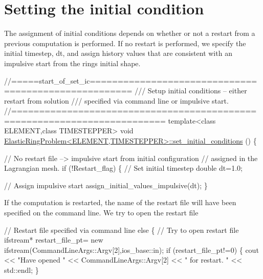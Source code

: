  

\hypertarget{index_IC}{}\section{Setting the initial condition}\label{index_IC}
The assignment of initial conditions depends on whether or not a restart from a previous computation is performed. If no restart is performed, we specify the initial timestep, {\ttfamily dt}, and assign history values that are consistent with an impulsive start from the ring\textquotesingle{}s initial shape.


\begin{DoxyCodeInclude}
\textcolor{comment}{//=====start\_of\_set\_ic=====================================================}
\textcolor{comment}{/// Setup initial conditions -- either restart from solution }
\textcolor{comment}{}\textcolor{comment}{/// specified via command line or impulsive start. }
\textcolor{comment}{}\textcolor{comment}{//=========================================================================}
\textcolor{keyword}{template}<\textcolor{keyword}{class} ELEMENT,\textcolor{keyword}{class} TIMESTEPPER>
\textcolor{keywordtype}{void} \hyperlink{classElasticRingProblem_ab435f36b59e5f76301123c3440363704}{ElasticRingProblem<ELEMENT,TIMESTEPPER>::set\_initial\_conditions}
      ()
\{

 \textcolor{comment}{// No restart file --> impulsive start from initial configuration}
 \textcolor{comment}{// assigned in the Lagrangian mesh.}
 \textcolor{keywordflow}{if} (!Restart\_flag)
  \{
   \textcolor{comment}{// Set initial timestep}
   \textcolor{keywordtype}{double} dt=1.0; 

   \textcolor{comment}{// Assign impulsive start}
   assign\_initial\_values\_impulsive(dt);
  \}

\end{DoxyCodeInclude}


If the computation is restarted, the name of the restart file will have been specified on the command line. We try to open the restart file


\begin{DoxyCodeInclude}
 \textcolor{comment}{// Restart file specified via command line}
 \textcolor{keywordflow}{else}
  \{
   \textcolor{comment}{// Try to open restart file}
   ifstream* restart\_file\_pt= 
    \textcolor{keyword}{new} ifstream(CommandLineArgs::Argv[2],ios\_base::in);
   \textcolor{keywordflow}{if} (restart\_file\_pt!=0)
    \{
     cout << \textcolor{stringliteral}{"Have opened "} << CommandLineArgs::Argv[2] << 
      \textcolor{stringliteral}{" for restart. "} << std::endl;
    \}

\end{DoxyCodeInclude}


